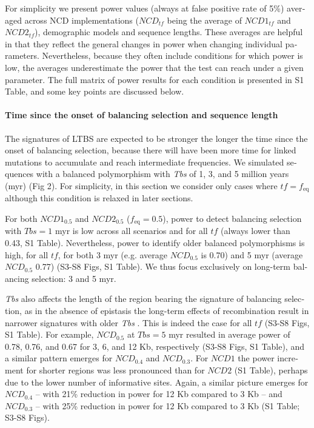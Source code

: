 \begin{refsection}
\begin{otherlanguage}{english}
For simplicity we present power values (always at false positive rate of 5\%) averaged across NCD implementations ($NCD_{tf}$ being the average of $NCD1_{tf}$ and $NCD2_{tf}$), demographic models and sequence lengths. These averages are helpful in that they reflect the general changes in power when changing individual parameters. Nevertheless, because they often include conditions for which power is low, the averages underestimate the power that the test can reach under a given parameter. The full matrix of power results for each condition is presented in S1 Table, and some key points are discussed below.

\paragraph{Time since the onset of balancing selection and sequence length}

The signatures of LTBS are expected to be stronger the longer the time since the onset of balancing selection, because there will have been more time for linked mutations to accumulate and reach intermediate frequencies. We
simulated sequences with a balanced polymorphism with \emph{Tbs} of 1, 3, and 5 million years (myr) (Fig 2). For simplicity, in this section we consider only cases where $tf=f_{\mathrm{eq}}$ although this condition is relaxed in later sections.

For both $NCD1_{0.5}$ and $NCD2_{0.5}$ ($f_{\mathrm{eq}}=0.5$), power to detect balancing selection with $Tbs=1$ myr is low across all scenarios and for all $tf$ (always lower than 0.43, S1 Table). Nevertheless, power to identify older balanced
polymorphisms is high, for all $tf$, for both 3 myr (e.g. average $NCD_{0.5}$ is 0.70) and 5 myr (average $NCD_{0.5}$ 0.77) (S3-S8 Figs, S1 Table). We thus focus exclusively on long-term balancing selection: 3 and 5 myr.

\emph{Tbs} also affects the length of the region bearing the signature of balancing selection, as in the absence of epistasis the long-term effects of recombination result in narrower signatures with older \emph{Tbs} \parencite{Leffler2013a,Teixeira2015}. This is indeed the case for all $tf$ (S3-S8 Figs, S1 Table). For example, $NCD_{0.5}$ at $Tbs=5$ myr resulted in average power of 0.78, 0.76, and 0.67 for 3, 6, and 12 Kb, respectively (S3-S8 Figs, S1 Table), and a similar pattern emerges for $NCD_{0.4}$ and $NCD_{0.3}$. For $NCD1$ the power increment for shorter regions was less pronounced than for $NCD2$ (S1 Table), perhaps due to the lower number of informative sites. Again, a similar picture emerges for $NCD_{0.4}$ – with 21\% reduction in power for 12 Kb compared to 3 Kb – and $NCD_{0.3}$ – with 25\% reduction in power for 12 Kb compared to 3 Kb (S1 Table; S3-S8 Figs).


\end{otherlanguage}
\end{refsection}
